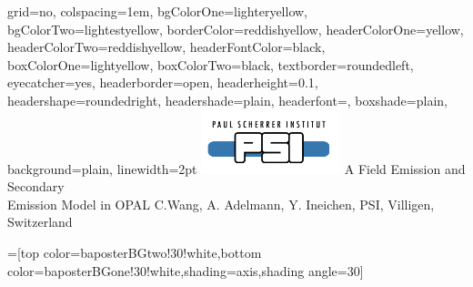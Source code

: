 \documentclass[portrait,final]{baposter}
\begin{document}
\newlength{\leftimgwidth}
\begin{poster}%
  {
  grid=no,
  colspacing=1em,
  bgColorOne=lighteryellow,
  bgColorTwo=lightestyellow,
  borderColor=reddishyellow,
  headerColorOne=yellow,
  headerColorTwo=reddishyellow,
  headerFontColor=black,
  boxColorOne=lightyellow,
  boxColorTwo=black,
  textborder=roundedleft,
  eyecatcher=yes,
  headerborder=open,
  headerheight=0.1\textheight,
  headershape=roundedright,
  headershade=plain,
  headerfont=\large\textsf, %
  boxshade=plain,
  background=plain,
  linewidth=2pt
  }
  {\includegraphics[height=5em]{logopsi}} %
  {\sf %
  A Field Emission and Secondary\\[3mm] Emission Model in OPAL}
  {\sf %
  \vspace{1em}C.Wang, A. Adelmann, Y. Ineichen, PSI, Villigen, Switzerland \\
 
 
  }
  {%
    \makebox[8em][r]{%
      \begin{minipage}{12em}
        \hfill
      \end{minipage}
    }
  }

  =[top color=baposterBGtwo!30!white,bottom color=baposterBGone!30!white,shading=axis,shading angle=30]

     \setlength{\leftimgwidth}{0.78em+8.0em}

    \newcommand{\colouredcircle}[1]{%
      \tikz{\useasboundingbox (-0.2em,-0.32em) rectangle(0.2em,0.32em); \draw[draw=black,fill=baposterBGone!80!black!#1!white,line width=0.03em] (0,0) circle(0.18em);}}


\end{poster}
\end{document}
